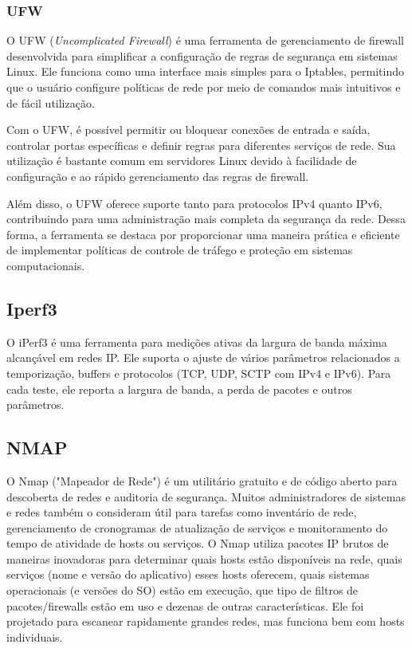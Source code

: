 \subsubsection{UFW}

O UFW (\textit{Uncomplicated Firewall}) é uma ferramenta de gerenciamento de firewall desenvolvida para simplificar a configuração de regras de segurança em sistemas Linux. Ele funciona como uma interface mais simples para o Iptables, permitindo que o usuário configure políticas de rede por meio de comandos mais intuitivos e de fácil utilização.

Com o UFW, é possível permitir ou bloquear conexões de entrada e saída, controlar portas específicas e definir regras para diferentes serviços de rede. Sua utilização é bastante comum em servidores Linux devido à facilidade de configuração e ao rápido gerenciamento das regras de firewall.

Além disso, o UFW oferece suporte tanto para protocolos IPv4 quanto IPv6, contribuindo para uma administração mais completa da segurança da rede. Dessa forma, a ferramenta se destaca por proporcionar uma maneira prática e eficiente de implementar políticas de controle de tráfego e proteção em sistemas computacionais.


\subsection{Iperf3}
O iPerf3 é uma ferramenta para medições ativas da largura de banda máxima alcançável
 em redes IP. Ele suporta o ajuste de vários parâmetros relacionados a temporização, buffers e protocolos (TCP, UDP, SCTP com IPv4 e IPv6). Para cada teste, ele reporta a largura de banda, a perda de pacotes e outros parâmetros.

\subsection{NMAP}

O Nmap ("Mapeador de Rede") é um utilitário gratuito e de código aberto para descoberta de redes e auditoria de segurança. Muitos administradores de sistemas e redes também o consideram útil para tarefas como inventário de rede, gerenciamento de cronogramas de atualização de serviços e monitoramento do tempo de atividade de hosts ou serviços. O Nmap utiliza pacotes IP brutos de maneiras inovadoras para determinar quais hosts estão disponíveis na rede, quais serviços (nome e versão do aplicativo) esses hosts oferecem, quais sistemas operacionais (e versões do SO) estão em execução, que tipo de filtros de pacotes/firewalls estão em uso e dezenas de outras características. Ele foi projetado para escanear rapidamente grandes redes, mas funciona bem com hosts individuais. 

